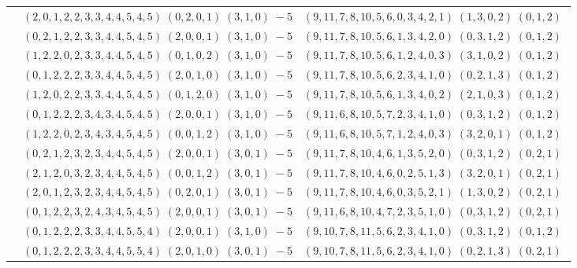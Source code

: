 \documentclass[11pt]{article}
\begin{document}
\begin{longtable}[l]{|c|c|c|}
 \cline{2-3} 
 & $(2 ,0 ,1 ,2 ,2 ,3 ,3 ,4 ,4 ,5 ,4 ,5) \;(0 ,2 ,0 ,1) \;(3 ,1 ,0) \;-5$ & $(9 ,11 ,7 ,8 ,10 ,5 ,6 ,0 ,3 ,4 ,2 ,1) \;(1 ,3 ,0 ,2) \;(0 ,1 ,2) \;$\\ 
 \cline{2-3} 
 & $(0 ,2 ,1 ,2 ,2 ,3 ,3 ,4 ,4 ,5 ,4 ,5) \;(2 ,0 ,0 ,1) \;(3 ,1 ,0) \;-5$ & $(9 ,11 ,7 ,8 ,10 ,5 ,6 ,1 ,3 ,4 ,2 ,0) \;(0 ,3 ,1 ,2) \;(0 ,1 ,2) \;$\\ 
 \cline{2-3} 
 & $(1 ,2 ,2 ,0 ,2 ,3 ,3 ,4 ,4 ,5 ,4 ,5) \;(0 ,1 ,0 ,2) \;(3 ,1 ,0) \;-5$ & $(9 ,11 ,7 ,8 ,10 ,5 ,6 ,1 ,2 ,4 ,0 ,3) \;(3 ,1 ,0 ,2) \;(0 ,1 ,2) \;$\\ 
 \cline{2-3} 
 & $(0 ,1 ,2 ,2 ,2 ,3 ,3 ,4 ,4 ,5 ,4 ,5) \;(2 ,0 ,1 ,0) \;(3 ,1 ,0) \;-5$ & $(9 ,11 ,7 ,8 ,10 ,5 ,6 ,2 ,3 ,4 ,1 ,0) \;(0 ,2 ,1 ,3) \;(0 ,1 ,2) \;$\\ 
 \cline{2-3} 
 & $(1 ,2 ,0 ,2 ,2 ,3 ,3 ,4 ,4 ,5 ,4 ,5) \;(0 ,1 ,2 ,0) \;(3 ,1 ,0) \;-5$ & $(9 ,11 ,7 ,8 ,10 ,5 ,6 ,1 ,3 ,4 ,0 ,2) \;(2 ,1 ,0 ,3) \;(0 ,1 ,2) \;$\\ 
 \cline{2-3} 
 & $(0 ,1 ,2 ,2 ,2 ,3 ,4 ,3 ,4 ,5 ,4 ,5) \;(2 ,0 ,0 ,1) \;(3 ,1 ,0) \;-5$ & $(9 ,11 ,6 ,8 ,10 ,5 ,7 ,2 ,3 ,4 ,1 ,0) \;(0 ,3 ,1 ,2) \;(0 ,1 ,2) \;$\\ 
 \cline{2-3} 
 & $(1 ,2 ,2 ,0 ,2 ,3 ,4 ,3 ,4 ,5 ,4 ,5) \;(0 ,0 ,1 ,2) \;(3 ,1 ,0) \;-5$ & $(9 ,11 ,6 ,8 ,10 ,5 ,7 ,1 ,2 ,4 ,0 ,3) \;(3 ,2 ,0 ,1) \;(0 ,1 ,2) \;$\\ 
 \cline{2-3} 
 & $(0 ,2 ,1 ,2 ,3 ,2 ,3 ,4 ,4 ,5 ,4 ,5) \;(2 ,0 ,0 ,1) \;(3 ,0 ,1) \;-5$ & $(9 ,11 ,7 ,8 ,10 ,4 ,6 ,1 ,3 ,5 ,2 ,0) \;(0 ,3 ,1 ,2) \;(0 ,2 ,1) \;$\\ 
 \cline{2-3} 
 & $(2 ,1 ,2 ,0 ,3 ,2 ,3 ,4 ,4 ,5 ,4 ,5) \;(0 ,0 ,1 ,2) \;(3 ,0 ,1) \;-5$ & $(9 ,11 ,7 ,8 ,10 ,4 ,6 ,0 ,2 ,5 ,1 ,3) \;(3 ,2 ,0 ,1) \;(0 ,2 ,1) \;$\\ 
 \cline{2-3} 
 & $(2 ,0 ,1 ,2 ,3 ,2 ,3 ,4 ,4 ,5 ,4 ,5) \;(0 ,2 ,0 ,1) \;(3 ,0 ,1) \;-5$ & $(9 ,11 ,7 ,8 ,10 ,4 ,6 ,0 ,3 ,5 ,2 ,1) \;(1 ,3 ,0 ,2) \;(0 ,2 ,1) \;$\\ 
 \cline{2-3} 
 & $(0 ,1 ,2 ,2 ,3 ,2 ,4 ,3 ,4 ,5 ,4 ,5) \;(2 ,0 ,0 ,1) \;(3 ,0 ,1) \;-5$ & $(9 ,11 ,6 ,8 ,10 ,4 ,7 ,2 ,3 ,5 ,1 ,0) \;(0 ,3 ,1 ,2) \;(0 ,2 ,1) \;$\\ 
 \cline{2-3} 
 & $(0 ,1 ,2 ,2 ,2 ,3 ,3 ,4 ,4 ,5 ,5 ,4) \;(2 ,0 ,0 ,1) \;(3 ,1 ,0) \;-5$ & $(9 ,10 ,7 ,8 ,11 ,5 ,6 ,2 ,3 ,4 ,1 ,0) \;(0 ,3 ,1 ,2) \;(0 ,1 ,2) \;$\\ 
 \cline{2-3} 
 & $(0 ,1 ,2 ,2 ,2 ,3 ,3 ,4 ,4 ,5 ,5 ,4) \;(2 ,0 ,1 ,0) \;(3 ,0 ,1) \;-5$ & $(9 ,10 ,7 ,8 ,11 ,5 ,6 ,2 ,3 ,4 ,1 ,0) \;(0 ,2 ,1 ,3) \;(0 ,2 ,1) \;$\\ 

\end{longtable}
\end{document}
